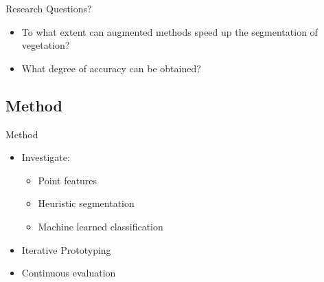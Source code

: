 \documentclass{beamer}
\begin{document}
\begin{frame}{Research Questions?}

\begin{itemize}
\item To what extent can augmented methods speed up the segmentation of vegetation?
\item What degree of accuracy can be obtained?
\end{itemize}

\end{frame}

\subsection{Method}

\begin{frame}{Method}

\begin{itemize}
\item Investigate:
\begin{itemize}
  \item Point features
  \item Heuristic segmentation
  \item Machine learned classification
\end{itemize}
\item Iterative Prototyping
\item Continuous evaluation
\end{itemize}

\end{frame}
\end{document}
